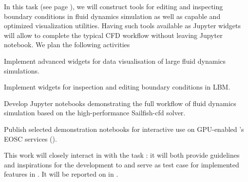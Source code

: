 \begin{task}[
  title=Demonstrator: Visualisation and control of fluid dynamics in Jupyter notebook,
  id=application-gpu,
  lead=SIL,
  PM=12,
  wphases={4-36!.3},
  partners={EGI}
]


In this task (see page \pageref{sec:concept-demonstrator-gpu}), we will construct tools for editing and inspecting boundary conditions in fluid dynamics simulation as well as capable and optimized visualization utilities. 
Having such tools available as Jupyter widgets will allow to complete the typical CFD workflow without leaving Jupyter notebook. We plan the following activities
\begin{compactitem}

\item Implement advanced widgets for data visualisation of large
  fluid dynamics simulations.
\item Implement widgets for inspection and editing boundary
  conditions in LBM.
\item Develop Jupyter notebooks demonstrating the full workflow of  fluid
  dynamics simulation based on the high-performance Sailfish-cfd solver.
  \item Publish selected demonstration notebooks for interactive use on
    GPU-enabled \TheProject's EOSC services ().
\end{compactitem}

This work will closely interact in with the task
: it will both provide guidelines and inspirations
for the development to  and serve
as test case for implemented features in
.
%
  It will be reported on in
  .
\end{task}

